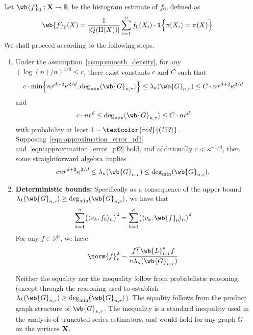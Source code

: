 \documentclass{article}
\newcommand{\Reals}{\mathbb{R}}
\newcommand{\abs}[1]{\left \lvert #1 \right \rvert}
\newcommand{\1}{\mathbf{1}}
\newcommand{\dotp}[2]{\langle #1, #2 \rangle}
\theoremstyle{alden}
\theoremstyle{aldenthm}
\theoremstyle{definition}
\theoremstyle{remark}
\begin{document}
Let $\wb{f}_0: {\bf X} \to \Reals$ be the histogram estimate of $f_0$, defined as
\begin{equation*}
\wb{f}_0(X) = \frac{1}{\abs{Q(\Pi(X))}} \sum_{i = 1}^{n} f_0(X_i) \cdot \1\Bigl\{\pi(X_i) = \pi(X)\Bigr\}
\end{equation*}
We shall proceed according to the following steps.
\begin{enumerate}
	\item Under the assumption~\ref{asmp:smooth_density}, for any $(\log(n)/n)^{1/d} \leq r$, there exist constants $c$ and $C$ such that
	\begin{equation}
	\label{eqn:approximation_error_pf1}
	c \cdot \min\Bigl\{nr^{d+2}\kappa^{2/d}, \deg_{\min}(\wb{G}_{n,r})\Bigr\} \leq \lambda_{\kappa}(\wb{G}_{n,r}) \leq C \cdot nr^{d + 2}\kappa^{2/d}
	\end{equation}
	and
	\begin{equation}
	\label{eqn:approximation_error_pf2}
	c\cdot nr^{d} \leq \deg_{\min}(\wb{G}_{n,r}) \leq C \cdot nr^d
	\end{equation}
	with probability at least $1 - \textcolor{red}{(???)}$.  Supposing~\eqref{eqn:approximation_error_pf1} and~\eqref{eqn:approximation_error_pf2} hold, and additionally $r < \kappa^{-1/d}$, then some straightforward algebra implies
	\begin{equation*}
	c n r^{d+2} \kappa^{2/d}  \leq \lambda_{\kappa}(\wb{G}_{n,r}) \leq \deg_{\min}(\wb{G}_{n,r}).
	\end{equation*}
	\item \textbf{Deterministic bounds:} 
	Specifically as a consequence of the upper bound  $\lambda_k(\wb{G}_{n,r}) \geq \deg_{\min}(\wb{G}_{n,r})$, we have that
	\begin{equation}
	\label{eqn:approximation_error_pf3}
	\sum_{k = 1}^{\kappa} \bigl(\dotp{v_k}{f_0}_n\bigr)^2 = \sum_{k = 1}^{\kappa} \bigl(\dotp{v_k}{\wb{f}_0}_n\bigr)^2
	\end{equation}
	For any $f \in \Reals^n$, we have
	\begin{equation}
	\norm{f}_n^2 - \frac{f^T \wb{L}_{n,r}^s f}{n \lambda_{\kappa}(\wb{G}_{n,r})}
	\end{equation}
	
	Neither the equality nor the inequality follow from probabilistic reasoning (except through the reasoning used to establish $\lambda_k(\wb{G}_{n,r}) \geq \deg_{\min}(\wb{G}_{n,r})$). The equality follows from the product graph structure of $\wb{G}_{n,r}$. The inequality is a standard inequality used in the analysis of truncated-series estimators, and would hold for any graph $G$ on the vertices ${\bf X}$. 
	

\end{enumerate}
\end{document}
